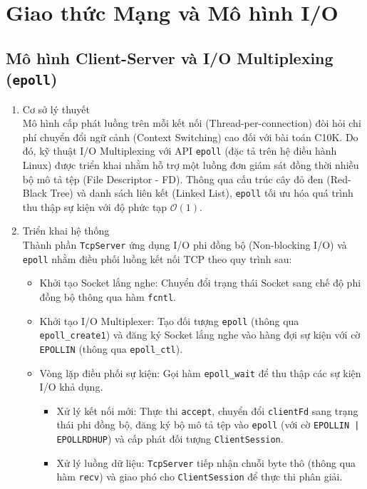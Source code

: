 \section{Giao thức Mạng và Mô hình I/O}

\subsection[Mô hình Client-Server và I/O Multiplexing]{Mô hình Client-Server và I/O Multiplexing (\texttt{epoll})}

\begin{enumerate}
    \item Cơ sở lý thuyết \\
    Mô hình cấp phát luồng trên mỗi kết nối (Thread-per-connection) đòi hỏi chi phí chuyển đổi ngữ cảnh (Context Switching) cao đối với bài toán C10K. Do đó, kỹ thuật I/O Multiplexing với API \texttt{epoll} (đặc tả trên hệ điều hành Linux) được triển khai nhằm hỗ trợ một luồng đơn giám sát đồng thời nhiều bộ mô tả tệp (File Descriptor - FD). Thông qua cấu trúc cây đỏ đen (Red-Black Tree) và danh sách liên kết (Linked List), \texttt{epoll} tối ưu hóa quá trình thu thập sự kiện với độ phức tạp $\mathcal{O}(1)$.

    \item Triển khai hệ thống \\
    Thành phần \texttt{TcpServer} ứng dụng I/O phi đồng bộ (Non-blocking I/O) và \texttt{epoll} nhằm điều phối luồng kết nối TCP theo quy trình sau:
    \begin{itemize}[label={-}]
        \item Khởi tạo Socket lắng nghe: Chuyển đổi trạng thái Socket sang chế độ phi đồng bộ thông qua hàm \texttt{fcntl}.
        \item Khởi tạo I/O Multiplexer: Tạo đối tượng \texttt{epoll} (thông qua \texttt{epoll\_create1}) và đăng ký Socket lắng nghe vào hàng đợi sự kiện với cờ \texttt{EPOLLIN} (thông qua \texttt{epoll\_ctl}).
        \item Vòng lặp điều phối sự kiện: Gọi hàm \texttt{epoll\_wait} để thu thập các sự kiện I/O khả dụng.
        \begin{itemize}[label={$\circ$}]
            \item Xử lý kết nối mới: Thực thi \texttt{accept}, chuyển đổi \texttt{clientFd} sang trạng thái phi đồng bộ, đăng ký bộ mô tả tệp vào \texttt{epoll} (với cờ \texttt{EPOLLIN | EPOLLRDHUP}) và cấp phát đối tượng \texttt{ClientSession}.
            \item Xử lý luồng dữ liệu: \texttt{TcpServer} tiếp nhận chuỗi byte thô (thông qua hàm \texttt{recv}) và giao phó cho \texttt{ClientSession} để thực thi phân giải.
        \end{itemize}
    \end{itemize}
\end{enumerate}


